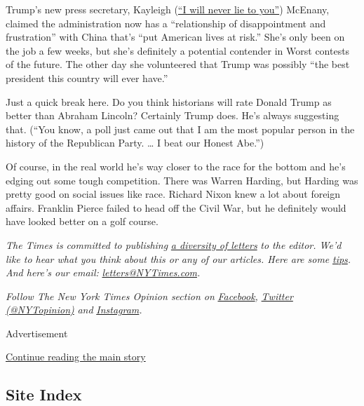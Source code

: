Trump's new press secretary, Kayleigh
(\href{https://www.nytimes3xbfgragh.onion/2020/05/01/us/politics/kayleigh-mcenany-white-house-briefing.html}{``I
will never lie to you''}) McEnany, claimed the administration now has a
``relationship of disappointment and frustration'' with China that's
``put American lives at risk.'' She's only been on the job a few weeks,
but she's definitely a potential contender in Worst contests of the
future. The other day she volunteered that Trump was possibly ``the best
president this country will ever have.''

Just a quick break here. Do you think historians will rate Donald Trump
as better than Abraham Lincoln? Certainly Trump does. He's always
suggesting that. (``You know, a poll just came out that I am the most
popular person in the history of the Republican Party. \ldots{} I beat
our Honest Abe.'')

Of course, in the real world he's way closer to the race for the bottom
and he's edging out some tough competition. There was Warren Harding,
but Harding was pretty good on social issues like race. Richard Nixon
knew a lot about foreign affairs. Franklin Pierce failed to head off the
Civil War, but he definitely would have looked better on a golf course.

\emph{The Times is committed to publishing}
\href{https://www.nytimes3xbfgragh.onion/2019/01/31/opinion/letters/letters-to-editor-new-york-times-women.html}{\emph{a
diversity of letters}} \emph{to the editor. We'd like to hear what you
think about this or any of our articles. Here are some}
\href{https://help.nytimes3xbfgragh.onion/hc/en-us/articles/115014925288-How-to-submit-a-letter-to-the-editor}{\emph{tips}}\emph{.
And here's our email:}
\href{mailto:letters@NYTimes.com}{\emph{letters@NYTimes.com}}\emph{.}

\emph{Follow The New York Times Opinion section on}
\href{https://www.facebookcorewwwi.onion/nytopinion}{\emph{Facebook}}\emph{,}
\href{http://twitter.com/NYTOpinion}{\emph{Twitter (@NYTopinion)}}
\emph{and}
\href{https://www.instagram.com/nytopinion/}{\emph{Instagram}}\emph{.}

Advertisement

\protect\hyperlink{after-bottom}{Continue reading the main story}

\hypertarget{site-index}{%
\subsection{Site Index}\label{site-index}}


